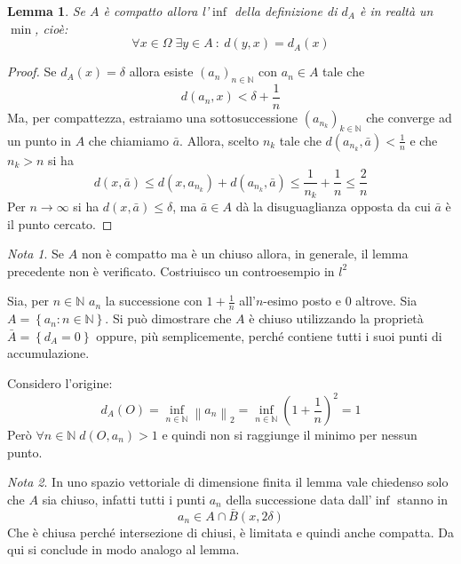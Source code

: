 \documentclass[a4paper,10pt]{article}
\theoremstyle{plain}
\newtheorem{mylem}{Lemma}[section]
\theoremstyle{definition}
\theoremstyle{remark}
\newtheorem{mynot}{Nota}[section]
\newcommand{\set}[1]{\left\{#1\right\}}
\newcommand{\pa}[1]{\left(#1\right)}
\newcommand{\norm}[1]{\left\|#1\right\|}
\begin{document}
\begin{mylem}
  Se $A$ è compatto allora l'$\inf$ della definizione di $d_A$ è in
  realtà un $\min$, cioè:
  \[ \forall x \in \Omega \; \exists y \in A \ :\ d(y,x) = d_A(x) \]
\end{mylem}
\begin{proof}
  Se $d_A(x) = \delta$ allora esiste $\pa{a_n}_{n\in \mathbb{N}}$ con
  $a_n \in A$ tale che
  \[ d(a_n,x) < \delta + \frac{1}{n} \] 
  Ma, per compattezza, estraiamo una sottosuccessione
  $\pa{a_{n_k}}_{k\in \mathbb{N}}$ che converge ad un punto in $A$ che
  chiamiamo $\bar a$.  Allora, scelto $n_k$ tale che $d(a_{n_k},\bar
  a) < \frac{1}{n}$ e che $n_k > n$ si ha
  \[ d(x,\bar a) \le d\pa{x,a_{n_k}} + d\pa{a_{n_k}, \bar a} \le
  \frac{1}{n_k} + \frac{1}{n} \le \frac{2}{n} \]
  Per $n \to \infty$ si ha $d(x,\bar a) \le \delta$, ma $\bar a \in A$
  dà la disuguaglianza opposta da cui $\bar a$ è il punto cercato.
\end{proof}

\begin{mynot}
  Se $A$ non è compatto ma è un chiuso allora, in generale, il lemma
  precedente non è verificato. Costriuisco un controesempio in $l^2$
  
  Sia, per $n\in \mathbb{N}$ $a_n$ la successione con $1+\frac{1}{n}$
  all'$n$-esimo posto e $0$ altrove. Sia $A = \set{a_n : n\in
    \mathbb{N}}$. Si pu\`o dimostrare che $A$ \`e chiuso utilizzando
  la propriet\`a $\bar A = \set {d_A = 0}$ oppure, più semplicemente,
  perché contiene tutti i suoi punti di accumulazione.

  Considero l'origine:
  \[ d_A(O) = \inf _{n\in \mathbb{N}} \norm{a_n}_2 = \inf _{n\in
    \mathbb{N}} \pa{1+\frac{1}{n}}^2 = 1 \]
  Però $\forall n\in \mathbb{N}\; d(O,a_n) > 1$ e quindi non si
  raggiunge il minimo per nessun punto.  
\end{mynot}

\begin{mynot}
  In uno spazio vettoriale di dimensione finita il lemma vale
  chiedenso solo che $A$ sia chiuso, infatti tutti i punti $a_n$ della
  successione data dall'$\inf$ stanno in 
  \[ a_n \in A \cap \bar B(x,2\delta) \]
  Che è chiusa perché intersezione di chiusi, è limitata e quindi
  anche compatta. Da qui si conclude in modo analogo al lemma.
\end{mynot}
\end{document}
